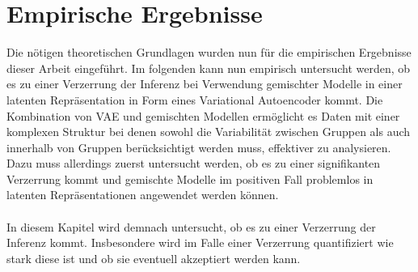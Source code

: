 \documentclass[%
thesis=student,%
coverpage=false,%
titlepage=false,%
headmarks=true, %
german,%
font=libertine, %
math=newpxtx, %
BCOR=5mm,%
coverBCOR=11mm%
]{tumbook}
\theoremstyle{break}
\begin{document}
\chapter{Empirische Ergebnisse}
Die nötigen theoretischen Grundlagen wurden nun für die empirischen Ergebnisse dieser Arbeit eingeführt. Im folgenden kann nun empirisch untersucht werden, ob es zu einer Verzerrung der Inferenz bei Verwendung gemischter Modelle in einer latenten Repräsentation in Form eines Variational Autoencoder kommt. Die Kombination von VAE und gemischten Modellen ermöglicht es Daten mit einer komplexen Struktur bei denen sowohl die Variabilität zwischen Gruppen als auch innerhalb von Gruppen berücksichtigt werden muss, effektiver zu analysieren. Dazu muss allerdings zuerst untersucht werden, ob es zu einer signifikanten Verzerrung kommt und gemischte Modelle im positiven Fall problemlos in latenten Repräsentationen angewendet werden können.\\
\\
In diesem Kapitel wird demnach untersucht, ob es zu einer Verzerrung der Inferenz kommt. Insbesondere wird im Falle einer Verzerrung quantifiziert wie stark diese ist und ob sie eventuell akzeptiert werden kann.\\
\end{document}

